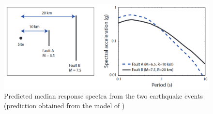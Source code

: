     \begin{figure}[H]
        \centering
        \includegraphics[scale=0.5]{Figures/Images/Background/DSHA.png}
        \caption{Predicted median response spectra from the two earthquake events (prediction obtained from the model of \cite{campbell_nga_2008})}
        \label{fig:DSHA}
    \end{figure}
